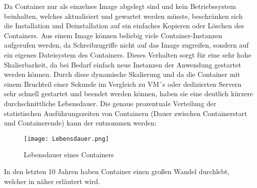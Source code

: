 Da Container nur als einzelnes Image abgelegt sind und kein Betriebssystem beinhalten, welches aktualisiert und gewartet werden müsste, beschränken sich die Installation und Deinstallation auf ein einfaches Kopieren oder Löschen des Containers. 
Aus einem Image können beliebig viele Container-Instanzen aufgerufen werden, da Schreibzugriffe nicht auf das Image zugreifen, sondern auf ein eigenes Dateisystem des Containers. Dieses Verhalten sorgt für eine sehr hohe Skalierbarkeit, da bei Bedarf einfach neue Instanzen der Anwendung gestartet werden können.\cite{12771285120180201}
Durch diese dynamische Skalierung und da die Container mit einem Bruchteil einer Sekunde im Vergleich zu VM´s oder dedizierten Servern sehr schnell gestartet und beendet werden können, haben sie eine deutlich kürzere durchschnittliche Lebensdauer. Die genaue prozentuale Verteilung der statistischen Ausführungszeiten von Containern (Dauer zwischen Containerstart und Containerende) kann der  entnommen werden:
\begin{figure}[H]
	\begin{center}
		\texttt{[image: Lebensdauer.png]}
	\end{center}
	\caption[Lebensdauer eines Containers]{Lebensdauer eines Containers \footnotemark}
	\label{fig:Lebensdauer}
\end{figure}
In den letzten 10 Jahren haben Container einen großen Wandel durchlebt, welcher in  näher erläutert wird.
\newpage